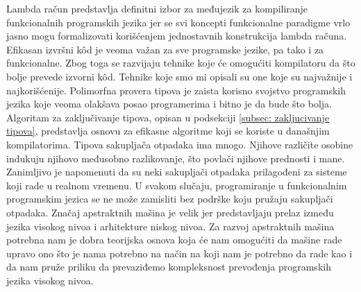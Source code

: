 \documentclass[a4paper]{article}
\begin{document}
Lambda račun predstavlja definitni izbor za međujezik za kompiliranje funkcionalnih programskih jezika jer se svi koncepti funkcionalne paradigme vrlo jasno mogu formalizovati korišćenjem jednostavnih konstrukcija lambda računa. Efikasan izvršni k\^od je veoma važan za sve programske jezike, pa tako i za funkcionalne. Zbog toga se razvijaju tehnike koje će omogućiti kompilatoru da što bolje prevede izvorni k\^od. Tehnike koje smo mi opisali su one koje su najvažnije i najkorišćenije. Polimorfna provera tipova je zaista korisno svojstvo programskih jezika koje veoma olakšava posao programerima i bitno je da bude što bolja. Algoritam za zaključivanje tipova, opisan u podsekciji \ref{subsec: zakljucivanje tipova}, predstavlja osnovu za efikasne algoritme koji se koriste u današnjim kompilatorima. Tipova sakupljača otpadaka ima mnogo. Njihove različite osobine indukuju njihovo međusobno razlikovanje, što povlači njihove prednosti i mane. Zanimljivo je napomenuti da su neki sakupljači otpadaka prilagođeni za sisteme koji rade u realnom vremenu. U svakom slučaju, programiranje u funkcionalnim programskim jezica se ne može zamisliti bez podrške koju pružaju sakupljači otpadaka. Značaj apstraktnih mašina je velik jer predstavljaju prelaz između jezika visokog nivoa i arhitekture niskog nivoa. Za razvoj apstraktnih mašina potrebna nam je dobra teorijska osnova koja će nam omogućiti da mašine rade upravo ono što je nama potrebno
na način na koji nam je potrebno da rade kao i da nam pruže priliku da prevaziđemo kompleksnost prevođenja programskih jezika visokog nivoa.


\appendix
 


\end{document}

